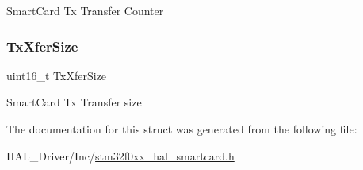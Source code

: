 Smart\+Card Tx Transfer Counter \mbox{\label{struct_s_m_a_r_t_c_a_r_d___handle_type_def_a80907b65d6f9541bc0dee444d16bc45b}} 
\subsubsection{\texorpdfstring{Tx\+Xfer\+Size}{TxXferSize}}
{\footnotesize\ttfamily uint16\+\_\+t Tx\+Xfer\+Size}

Smart\+Card Tx Transfer size 

The documentation for this struct was generated from the following file\+:\begin{DoxyCompactItemize}
\item 
H\+A\+L\+\_\+\+Driver/\+Inc/\hyperlink{stm32f0xx__hal__smartcard_8h}{stm32f0xx\+\_\+hal\+\_\+smartcard.\+h}\end{DoxyCompactItemize}
